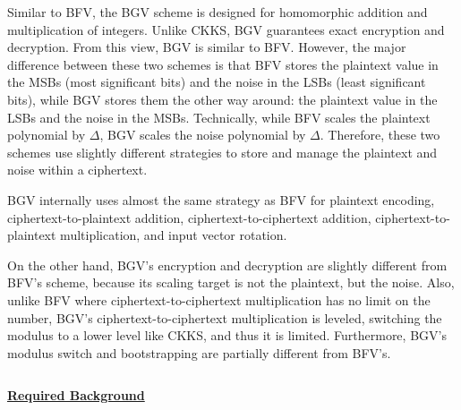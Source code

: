 
Similar to BFV, the BGV scheme is designed for homomorphic addition and multiplication of integers. Unlike CKKS, BGV guarantees exact encryption and decryption. From this view, BGV is similar to BFV. However, the major difference between these two schemes is that BFV stores the plaintext value in the MSBs (most significant bits) and the noise in the LSBs (least significant bits), while BGV stores them the other way around: the plaintext value in the LSBs and the noise in the MSBs. Technically, while BFV scales the plaintext polynomial by $\Delta$, BGV scales the noise polynomial by $\Delta$. Therefore, these two schemes use slightly different strategies to store and manage the plaintext and noise within a ciphertext. 

BGV internally uses almost the same strategy as BFV for plaintext encoding, ciphertext-to-plaintext addition, ciphertext-to-ciphertext addition, ciphertext-to-plaintext multiplication, and input vector rotation. 

On the other hand, BGV's encryption and decryption are slightly different from BFV's scheme, because its scaling target is not the plaintext, but the noise. Also, unlike BFV where ciphertext-to-ciphertext multiplication has no limit on the number, BGV's ciphertext-to-ciphertext multiplication is leveled, switching the modulus to a lower level like CKKS, and thus it is limited. Furthermore, BGV's modulus switch and bootstrapping are partially different from BFV's. 




$ $

\noindent \textbf{\underline{Required Background}}

